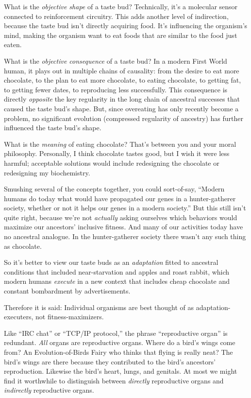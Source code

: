 {
 What is the \textit{objective shape} of a taste bud? Technically,
it's a molecular sensor connected to reinforcement
circuitry. This adds another level of indirection, because the taste
bud isn't directly acquiring food. It's
influencing the organism's mind, making the organism
want to eat foods that are similar to the food just eaten.}

{
 What is the \textit{objective consequence} of a taste bud? In a
modern First World human, it plays out in multiple chains of causality:
from the desire to eat more chocolate, to the plan to eat more
chocolate, to eating chocolate, to getting fat, to getting fewer dates,
to reproducing less successfully. This consequence is directly
\textit{opposite} the key regularity in the long chain of ancestral
successes that caused the taste bud's shape. But, since
overeating has only recently become a problem, no significant evolution
(compressed regularity of ancestry) has further influenced the taste
bud's shape.}

{
 What is the \textit{meaning} of eating chocolate?
That's between you and your moral philosophy.
Personally, I think chocolate tastes good, but I wish it were less
harmful; acceptable solutions would include redesigning the chocolate
or redesigning my biochemistry.}

{
 Smushing several of the concepts together, you could sort-of-say,
``Modern humans do today what would have propagated
our genes in a hunter-gatherer society, whether or not it helps our
genes in a modern society.'' But this still
isn't quite right, because we're not
\textit{actually} asking ourselves which behaviors would maximize our
ancestors' inclusive fitness. And many of our
activities today have no ancestral analogue. In the hunter-gatherer
society there wasn't any such thing as chocolate.}

{
 So it's better to view our taste buds as an
\textit{adaptation} fitted to ancestral conditions that included
near-starvation and apples and roast rabbit, which modern humans
\textit{execute} in a new context that includes cheap chocolate and
constant bombardment by advertisements.}

{
 Therefore it is said: Individual organisms are best thought of as
adaptation-executers, not fitness-maximizers.}

\myendsectiontext


\bigskip


{
 Like ``IRC chat'' or
``TCP/IP protocol,'' the phrase
``reproductive organ'' is redundant.
\textit{All} organs are reproductive organs. Where do a
bird's wings come from? An Evolution-of-Birds Fairy who
thinks that flying is really neat? The bird's wings are
there because they contributed to the bird's
ancestors' reproduction. Likewise the
bird's heart, lungs, and genitals. At most we might
find it worthwhile to distinguish between \textit{directly}
reproductive organs and \textit{indirectly} reproductive organs. }

